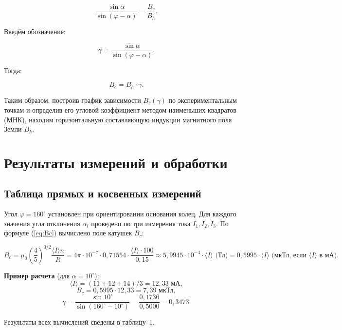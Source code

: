 \begin{equation}
\frac{\sin\alpha}{\sin(\varphi - \alpha)} = \frac{B_c}{B_h}.
\label{eq:sine}
\end{equation}

Введём обозначение:

\begin{equation}
\gamma = \frac{\sin\alpha}{\sin(\varphi - \alpha)}.
\label{eq:gamma}
\end{equation}

Тогда:

\begin{equation}
B_c = B_h \cdot \gamma.
\label{eq:linear}
\end{equation}

Таким образом, построив график зависимости $B_c(\gamma)$ по экспериментальным точкам и определив его угловой коэффициент методом наименьших квадратов (МНК), находим горизонтальную составляющую индукции магнитного поля Земли $B_h$.

\section{Результаты измерений и обработки}

\subsection{Таблица прямых и косвенных измерений}

Угол $\varphi = 160^\circ$ установлен при ориентировании основания колец. Для каждого значения угла отклонения $\alpha_i$ проведено по три измерения тока $I_1, I_2, I_3$. По формуле (\ref{eq:Bc}) вычислено поле катушек $B_c$:

\[
B_c = \mu_0 \left(\frac{4}{5}\right)^{3/2} \frac{\langle I \rangle n}{R}
    = 4\pi \cdot 10^{-7} \cdot 0{,}71554 \cdot \frac{\langle I \rangle \cdot 100}{0{,}15}
    \approx 5{,}9945 \cdot 10^{-4} \cdot \langle I \rangle \text{ (Тл)}
    = 0{,}5995 \cdot \langle I \rangle \text{ (мкТл, если $\langle I \rangle$ в мА)}.
\]

\textbf{Пример расчета} (для $\alpha = 10^\circ$):
\[
\langle I \rangle = (11 + 12 + 14) / 3 = 12{,}33 \text{ мА},
\]
\[
B_c = 0{,}5995 \cdot 12{,}33 = 7{,}39 \text{ мкТл},
\]
\[
\gamma = \frac{\sin 10^\circ}{\sin(160^\circ - 10^\circ)} = \frac{0{,}1736}{0{,}5000} = 0{,}3473.
\]

Результаты всех вычислений сведены в таблицу~1.

